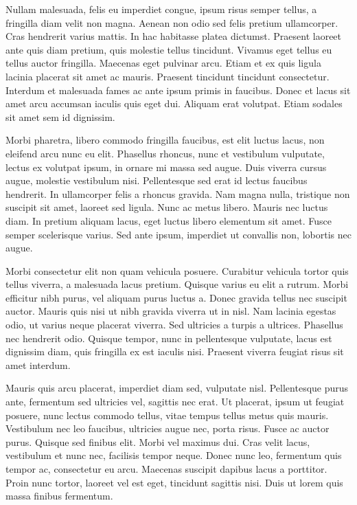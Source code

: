 Nullam malesuada, felis eu imperdiet congue, ipsum risus semper tellus, a fringilla diam velit non magna. Aenean non odio sed felis pretium ullamcorper. Cras hendrerit varius mattis. In hac habitasse platea dictumst. Praesent laoreet ante quis diam pretium, quis molestie tellus tincidunt. Vivamus eget tellus eu tellus auctor fringilla. Maecenas eget pulvinar arcu. Etiam et ex quis ligula lacinia placerat sit amet ac mauris. Praesent tincidunt tincidunt consectetur. Interdum et malesuada fames ac ante ipsum primis in faucibus. Donec et lacus sit amet arcu accumsan iaculis quis eget dui. Aliquam erat volutpat. Etiam sodales sit amet sem id dignissim.

Morbi pharetra, libero commodo fringilla faucibus, est elit luctus lacus, non eleifend arcu nunc eu elit. Phasellus rhoncus, nunc et vestibulum vulputate, lectus ex volutpat ipsum, in ornare mi massa sed augue. Duis viverra cursus augue, molestie vestibulum nisi. Pellentesque sed erat id lectus faucibus hendrerit. In ullamcorper felis a rhoncus gravida. Nam magna nulla, tristique non suscipit sit amet, laoreet sed ligula. Nunc ac metus libero. Mauris nec luctus diam. In pretium aliquam lacus, eget luctus libero elementum sit amet. Fusce semper scelerisque varius. Sed ante ipsum, imperdiet ut convallis non, lobortis nec augue.

Morbi consectetur elit non quam vehicula posuere. Curabitur vehicula tortor quis tellus viverra, a malesuada lacus pretium. Quisque varius eu elit a rutrum. Morbi efficitur nibh purus, vel aliquam purus luctus a. Donec gravida tellus nec suscipit auctor. Mauris quis nisi ut nibh gravida viverra ut in nisl. Nam lacinia egestas odio, ut varius neque placerat viverra. Sed ultricies a turpis a ultrices. Phasellus nec hendrerit odio. Quisque tempor, nunc in pellentesque vulputate, lacus est dignissim diam, quis fringilla ex est iaculis nisi. Praesent viverra feugiat risus sit amet interdum.

Mauris quis arcu placerat, imperdiet diam sed, vulputate nisl. Pellentesque purus ante, fermentum sed ultricies vel, sagittis nec erat. Ut placerat, ipsum ut feugiat posuere, nunc lectus commodo tellus, vitae tempus tellus metus quis mauris. Vestibulum nec leo faucibus, ultricies augue nec, porta risus. Fusce ac auctor purus. Quisque sed finibus elit. Morbi vel maximus dui. Cras velit lacus, vestibulum et nunc nec, facilisis tempor neque. Donec nunc leo, fermentum quis tempor ac, consectetur eu arcu. Maecenas suscipit dapibus lacus a porttitor. Proin nunc tortor, laoreet vel est eget, tincidunt sagittis nisi. Duis ut lorem quis massa finibus fermentum.


